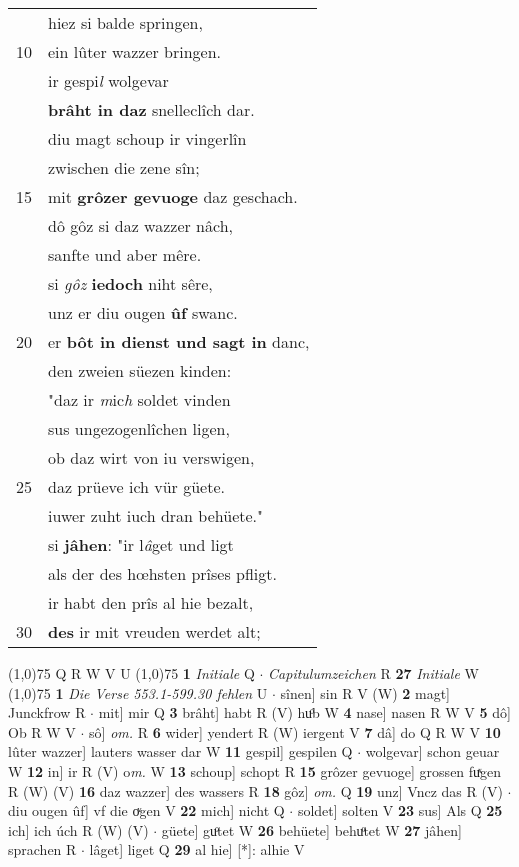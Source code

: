 \documentclass[8pt,a4paper,notitlepage]{article}
\begin{document}
\begin{table}[ht]
\begin{minipage}[t]{0.5\linewidth}
\begin{tabular}{rl}
 & hiez si balde springen,\\ 
10 & ein lûter wazzer bringen.\\ 
 & ir gespi\textit{l} wolgevar\\ 
 & \textbf{brâht in daz} snelleclîch dar.\\ 
 & diu magt schoup ir vingerlîn\\ 
 & zwischen die zene sîn;\\ 
15 & mit \textbf{grôzer gevuoge} daz geschach.\\ 
 & dô gôz si daz wazzer nâch,\\ 
 & sanfte und aber mêre.\\ 
 & si \textit{gôz} \textbf{iedoch} niht sêre,\\ 
 & unz er diu ougen \textbf{ûf} swanc.\\ 
20 & er \textbf{bôt in dienst und sagt in} danc,\\ 
 & den zweien süezen kinden:\\ 
 & "daz ir \textit{m}ic\textit{h} soldet vinden\\ 
 & sus ungezogenlîchen ligen,\\ 
 & ob daz wirt von iu verswigen,\\ 
25 & daz prüeve ich vür güete.\\ 
 & iuwer zuht iuch dran behüete."\\ 
 & si \textbf{jâhen}: "ir l\textit{â}get und ligt\\ 
 & als der des hœhsten prîses pfligt.\\ 
 & ir habt den prîs al hie bezalt,\\ 
30 & \textbf{des} ir mit vreuden werdet alt;\\ 
\end{tabular}
\scriptsize
\line(1,0){75} \newline
Q R W V U \newline
\line(1,0){75} \newline
\textbf{1} \textit{Initiale} Q   $\cdot$ \textit{Capitulumzeichen} R  \textbf{27} \textit{Initiale} W  \newline
\line(1,0){75} \newline
\textbf{1} \textit{Die Verse 553.1-599.30 fehlen} U   $\cdot$ sînen] sin R V (W) \textbf{2} magt] Junckfrow R  $\cdot$ mit] mir Q \textbf{3} brâht] habt R (V) huͦb W \textbf{4} nase] nasen R W V \textbf{5} dô] Ob R W V  $\cdot$ sô] \textit{om.} R \textbf{6} wider] yendert R (W) iergent V \textbf{7} dâ] do Q R W V \textbf{10} lûter wazzer] lauters wasser dar W \textbf{11} gespil] gespilen Q  $\cdot$ wolgevar] schon geuar W \textbf{12} in] ir R (V) o\textit{m. } W \textbf{13} schoup] schopt R \textbf{15} grôzer gevuoge] grossen fuͯgen R (W) (V) \textbf{16} daz wazzer] des wassers R \textbf{18} gôz] \textit{om.} Q \textbf{19} unz] Vncz das R (V)  $\cdot$ diu ougen ûf] vf die oͮgen V \textbf{22} mich] nicht Q  $\cdot$ soldet] solten V \textbf{23} sus] Als Q \textbf{25} ich] ich úch R (W) (V)  $\cdot$ güete] guͦtet W \textbf{26} behüete] behuͦtet W \textbf{27} jâhen] sprachen R  $\cdot$ lâget] liget Q \textbf{29} al hie] [*]: alhie V \newline
\end{minipage}
\end{table}
\end{document}

